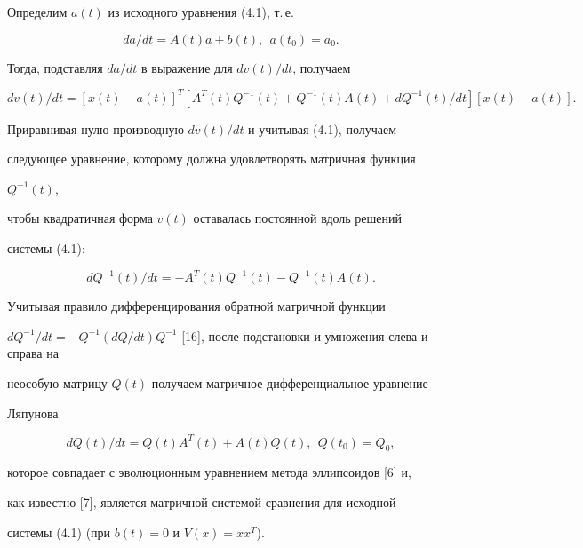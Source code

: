  


Определим $a(t)$ из исходного уравнения (4.1), т.\,е. 


\begin{equation} 


da/dt=A(t)a+b(t),\ \ a(t_0)=a_0. 


\end{equation} 


Тогда, подставляя $da/dt$ в выражение для $dv(t)/dt$, получаем 


$$ 


dv(t)/dt=[x(t)-a(t)]^T[A^T(t)Q^{-1}(t)+ 


Q^{-1}(t)A(t)+dQ^{-1}(t)/dt][x(t)-a(t)]. 


$$ 


 


Приравнивая нулю производную $dv(t)/dt$ и учитывая (4.1), получаем 


следующее уравнение, которому должна удовлетворять матричная функция 


$Q^{-1}(t)$, 


чтобы квадратичная форма $v(t)$ оставалась постоянной вдоль решений 


системы (4.1): 


$$ 


dQ^{-1}(t)/dt=-A^T(t)Q^{-1}(t)-Q^{-1}(t)A(t). 


$$ 


Учитывая правило дифференцирования обратной матричной функции 


$dQ^{-1}/dt=- 


Q^{-1}(dQ/dt)Q^{-1}$ [16], после подстановки и умножения слева и справа на 


неособую матрицу $Q(t)$ получаем матричное дифференциальное уравнение 


Ляпунова 


\begin{equation} 


dQ(t)/dt=Q(t)A^T(t)+A(t)Q(t),\ \ Q(t_0)=Q_0, 


\end{equation} 


которое совпадает с эволюционным уравнением метода эллипсоидов [6] и, 


как известно [7], является матричной системой сравнения для исходной 


системы (4.1) (при $b(t)=0$ и $V(x)=x x^T$). 


 


